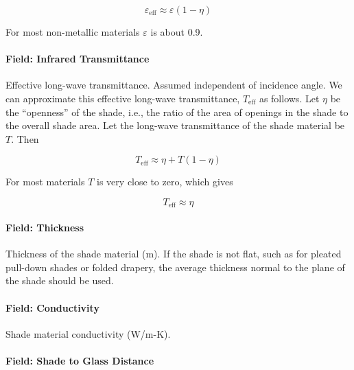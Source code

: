 \begin{equation}
{\varepsilon_{{\mathrm{eff}}}} \approx \varepsilon \left( {1 - \eta } \right)
\end{equation}

For most non-metallic materials \(\varepsilon\) is about 0.9.

\paragraph{Field: Infrared Transmittance}\label{field-infrared-transmittance}

Effective long-wave transmittance. Assumed independent of incidence angle. We can approximate this effective long-wave transmittance, \(T_{\mathrm{eff}}\) as follows. Let \(\eta\) be the ``openness'' of the shade, i.e., the ratio of the area of openings in the shade to the overall shade area. Let the long-wave transmittance of the shade material be \(T\). Then

\begin{equation}
T_{\mathrm{eff}} \approx \eta + T \left( 1 - \eta \right)
\end{equation}

For most materials \(T\) is very close to zero, which gives

\begin{equation}
T_{\mathrm{eff}} \approx \eta
\end{equation}

\paragraph{Field: Thickness}\label{field-thickness-6}

Thickness of the shade material (m). If the shade is not flat, such as for pleated pull-down shades or folded drapery, the average thickness normal to the plane of the shade should be used.

\paragraph{Field: Conductivity}\label{field-conductivity-3}

Shade material conductivity (W/m-K).

\paragraph{Field: Shade to Glass Distance}\label{field-shade-to-glass-distance}

